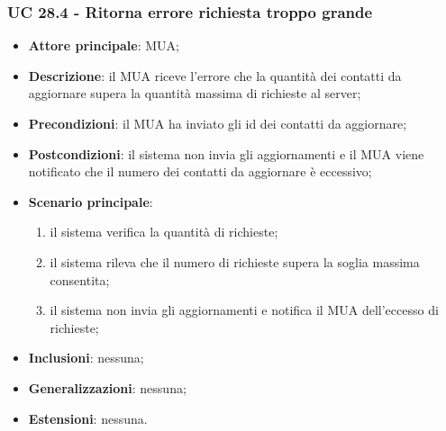     \subsubsection{UC 28.4 - Ritorna errore richiesta troppo grande} \label{sec:UC28.4}
    \begin{itemize}
        \item \textbf{Attore principale}: MUA;
        \item \textbf{Descrizione}: il MUA riceve l'errore che la quantità dei contatti da aggiornare supera la quantità massima di richieste al server;
        \item \textbf{Precondizioni}: il MUA ha inviato gli id dei contatti da aggiornare;
        \item \textbf{Postcondizioni}: il sistema non invia gli aggiornamenti e il MUA viene notificato che il numero dei contatti da aggiornare è eccessivo;
        \item \textbf{Scenario principale}:
            \begin{enumerate}
                \item il sistema verifica la quantità di richieste;
                \item il sistema rileva che il numero di richieste supera la soglia massima consentita;
                \item il sistema non invia gli aggiornamenti e notifica il MUA dell'eccesso di richieste;
            \end{enumerate}
        \item \textbf{Inclusioni}: nessuna;
        \item \textbf{Generalizzazioni}: nessuna;
        \item \textbf{Estensioni}: nessuna.
    \end{itemize}

